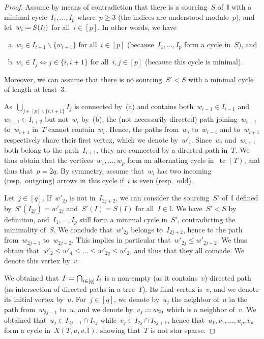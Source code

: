 \documentclass{amsart}
\theoremstyle{definition}
\newcommand{\ssm}{\smallsetminus} %
\newcommand{\eqdef}{\mbox{\,\raisebox{0.2ex}{\scriptsize\ensuremath{\mathrm:}}\ensuremath{=}\,}} %
\DeclareMathOperator{\tc}{tc} %
\newcommand{\II}{\mathbb I} %
\begin{document}
\begin{proof}
Assume by means of contradiction that there is a sourcing~$S$ of~$\II$ with a minimal cycle~$I_1, \dots, I_p$ where~$p \ge 3$ (the indices are understood modulo~$p$), and let~$w_i \eqdef S(I_i)$ for all~$i \in [p]$.
In other words, we have
\begin{enumerate}[(a)]
\item $w_i \in I_{i+1} \ssm \{w_{i+1}\}$ for all~$i \in [p]$ (because~$I_1, \dots, I_p$ form a cycle in~$S$), and
\item $w_i \in I_j \iff j \in \{i,i+1\}$ for all~$i,j \in [p]$ (because this cycle is minimal).
\end{enumerate}
Moreover, we can assume that there is no sourcing~$S' < S$ with a minimal cycle of length at least~$3$.

As~$\bigcup_{j \in [p] \ssm \{i,i+1\}} I_j$ is connected by~(a) and contains both~$w_{i-1} \in I_{i-1}$ and~$w_{i+1} \in I_{i+2}$ but not~$w_i$ by~(b), the (not necessarily directed) path joining~$w_{i-1}$ to~$w_{i+1}$ in~$T$ cannot contain~$w_i$.
Hence, the paths from~$w_i$ to~$w_{i-1}$ and to~$w_{i+1}$ respectively share their first vertex, which we denote by~$w'_i$.
Since~$w_i$ and~$w_{i+1}$ both belong to the path~$I_{i+1}$, they are connected by a directed path in~$T$.
We thus obtain that the vertices~$w_1, \dots, w_p$ form an alternating cycle in~$\tc(T)$, and thus that~$p = 2q$.
By symmetry, assume that~$w_i$ has two incoming (resp.~outgoing) arrows in this cycle if~$i$ is even (resp.~odd).

Let~$j \in [q]$.
If~$w'_{2j}$ is not in~$I_{2j+2}$, we can consider the sourcing~$S'$ of~$\II$ defined by~$S'(I_{2j}) = w'_{2j}$ and~$S'(I) = S(I)$ for all~$I \in \II$.
We have~$S' < S$ by definition, and~$I_1, \dots, I_p$ still form a minimal cycle in~$S'$, contradicting the minimality of~$S$.
We conclude that~$w'_{2j}$ belongs to~$I_{2j+2}$, hence to the path from~$w_{2j+1}$ to~$w_{2j+2}$.
This implies in particular that~$w'_{2j} \le w'_{2j+2}$.
We thus obtain that~$w'_2 \le w'_4 \le \dots \le w'_{2q} \le w'_2$, and thus that they all coincide.
We denote this vertex by~$v$.

We obtained that~$I \eqdef \bigcap_{i \in [q]} I_i$ is a non-empty (as it contains~$v$) directed path (as intersection of directed paths in a tree~$T$).
Its final vertex is~$v$, and we denote its initial vertex by~$u$.
For~$j \in [q]$, we denote by~$u_j$ the neighbor of~$u$ in the path from~$w_{2j-1}$ to~$u$, and we denote by~$v_j \eqdef w_{2j}$ which is a neighbor of~$v$.
We obtained that~$u_j \in I_{2j-1} \cap I_{2j}$ while~$v_j \in I_{2j} \cap I_{2j+1}$, hence that~$u_1, v_1, \dots, u_p, v_p$ form a cycle in~$X(T, u, v, \II)$, showing that~$T$ is not star sparse.
\end{proof}
\end{document}
